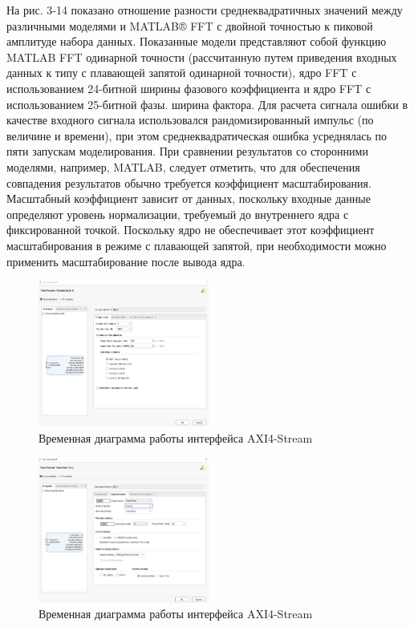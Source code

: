 На рис. 3-14 показано отношение разности среднеквадратичных значений между различными моделями и MATLAB® FFT с двойной точностью к пиковой амплитуде набора данных. Показанные модели представляют собой функцию MATLAB FFT одинарной точности (рассчитанную путем приведения входных данных к типу с плавающей запятой одинарной точности), ядро FFT с использованием 24-битной ширины фазового коэффициента и ядро FFT с использованием 25-битной фазы. ширина фактора. Для расчета сигнала ошибки в качестве входного сигнала использовался рандомизированный импульс (по величине и времени), при этом среднеквадратическая ошибка усреднялась по пяти запускам моделирования. При сравнении результатов со сторонними моделями, например, MATLAB, следует отметить, что для обеспечения совпадения результатов обычно требуется коэффициент масштабирования. Масштабный коэффициент зависит от данных, поскольку входные данные определяют уровень нормализации, требуемый до внутреннего ядра с фиксированной точкой. Поскольку ядро не обеспечивает этот коэффициент масштабирования в режиме с плавающей запятой, при необходимости можно применить масштабирование после вывода ядра.

\begin{figure}[h]
	\centering
	\includegraphics[width=0.5\textwidth]{image/fft_config.png}
	\caption{Временная диаграмма работы интерфейса AXI4-Stream}
	\label{fft_config}
\end{figure}
	
\begin{figure}[h]
	\centering
	\includegraphics[width=0.5\textwidth]{image/fft_implemetation.png}
	\caption{Временная диаграмма работы интерфейса AXI4-Stream}
	\label{fft_implemetation}
\end{figure}
	
